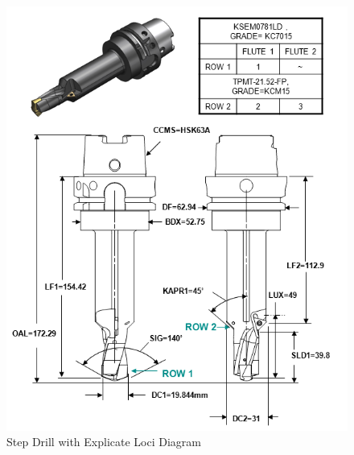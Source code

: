 \begin{figure}[ht]
  \centering
    \includegraphics[width=1.0\textwidth]{figures/Step Drill with Explicate Loci.png}
  \caption{Step Drill with Explicate Loci Diagram}
  \label{fig:Step Drill with Explicate Loci Diagram}
\end{figure}

\FloatBarrier


